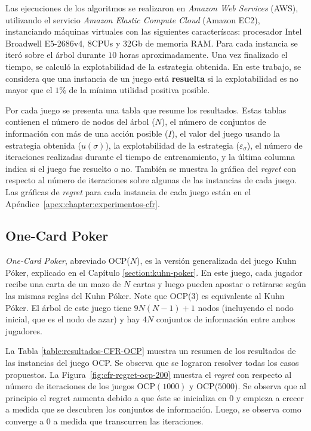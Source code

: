 Las ejecuciones de los algoritmos se realizaron en \textit{Amazon Web Services} (AWS), utilizando el servicio \textit{Amazon Elastic Compute Cloud} (Amazon EC2), instanciando máquinas virtuales con las siguientes caracteríscas: procesador Intel Broadwell E5-2686v4, 8CPUs y 32Gb de memoria RAM. Para cada instancia se iteró sobre el árbol durante $10$ horas aproximadamente. Una vez finalizado el tiempo, se calculó la explotabilidad de la estrategia obtenida. En este trabajo, se considera que una instancia de un juego está \textbf{resuelta} si la explotabilidad es no mayor que el $1\%$ de la mínima utilidad positiva posible.

Por cada juego se presenta una tabla que resume los resultados. Estas tablas contienen el número de nodos del árbol ($N$), el número de conjuntos de información con más de una acción posible ($I$), el valor del juego usando la estrategia obtenida ($u({\sigma})$), la explotabilidad de la estrategia ($\varepsilon_{\sigma}$), el número de iteraciones realizadas durante el tiempo de entrenamiento, y la última columna indica si el juego fue resuelto o no. También se muestra la gráfica del \textit{regret} con respecto al número de iteraciones sobre algunas de las instancias de cada juego. Las gráficas de \textit{regret} para cada instancia de cada juego están en el Apéndice~\ref{apex:chapter:experimentos-cfr}.

\subsection*{One-Card Poker}
\textit{One-Card Poker}, abreviado OCP($N$), es la versión generalizada del juego Kuhn Póker, explicado en el Capítulo \ref{section:kuhn-poker}. En este juego, cada jugador recibe una carta de un mazo de $N$ cartas y luego pueden apostar o retirarse según las mismas reglas del Kuhn Póker. Note que OCP(3) es equivalente al Kuhn Póker. El árbol de este juego tiene $9N(N-1)+1$ nodos (incluyendo el nodo inicial, que es el nodo de azar) y hay $4N$ conjuntos de información entre ambos jugadores. 

La Tabla \ref{table:resultados-CFR-OCP} muestra un resumen de los resultados de las instancias del juego OCP. Se observa que se lograron resolver todas los casos propuestos. La Figura~\ref{fig:cfr-regret-ocp-200} muestra el \textit{regret} con respecto al número de iteraciones de los juegos OCP$(1000)$ y OCP($5000$). Se observa que al principio el regret aumenta debido a que éste se inicializa en $0$ y empieza a crecer a medida que se descubren los conjuntos de información. Luego, se observa como converge a $0$ a medida que transcurren las iteraciones.

